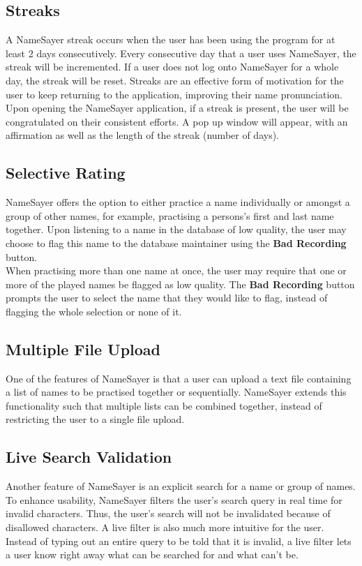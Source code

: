 \documentclass{article}
\begin{document}
\subsection{Streaks}
A NameSayer streak occurs when the user has been using the program for at least
2 days consecutively. Every consecutive day  that a user uses NameSayer, the
streak will be incremented. If a user does not log onto NameSayer for a whole
day, the  streak will be reset. Streaks are an effective form of motivation for
the user to keep returning to the application,  improving their name
pronunciation. \\

Upon opening the NameSayer application, if a streak is present, the user will be
congratulated on their consistent efforts. A pop up window will appear, with an
affirmation as well as the length of the streak (number of days).

\subsection{Selective Rating}
NameSayer offers the option to either practice a name individually or amongst a
group of other names, for example, practising a persons's first and last name
together. Upon listening to a name in the database of low quality, the user may
choose to flag this name to the database maintainer using the \textbf{Bad
Recording} button. \\

When practising more than one name at once, the user may require that one or
more of the played names be flagged as low quality. The \textbf{Bad Recording}
button prompts the user to select the name that they would like to flag, instead
of flagging the whole selection or none of it.

\subsection{Multiple File Upload}
One of the features of NameSayer is that a user can upload a text file
containing a list of names to be practised together or  sequentially. NameSayer
extends this functionality such that multiple lists can be combined together,
instead of restricting the user to a single file upload.

\subsection{Live Search Validation}
Another feature of NameSayer is an explicit search for a name or group of names.
To enhance usability, NameSayer filters  the user's search query in real time
for invalid characters. Thus, the user's search will not be invalidated because
of disallowed characters. A live filter is also much more intuitive for the
user. Instead of typing out an entire query to be told that it is invalid, a
live filter lets a user know right away what can be searched for and what can't
be.
\end{document}
